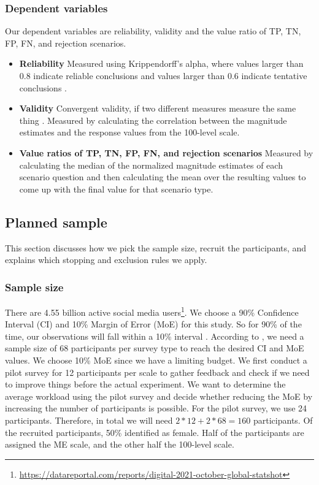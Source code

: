 \subsubsection{Dependent variables}
Our dependent variables are reliability, validity and the value ratio of TP, TN, FP, FN, and rejection scenarios.
%
\begin{itemize}
    \item \textbf{Reliability} Measured using Krippendorff's alpha, where values larger than 0.8 indicate reliable conclusions and values larger than 0.6 indicate tentative conclusions \citep{krippendorff2004reliability}.
    \item \textbf{Validity} Convergent validity, if two different measures measure the same thing \citep{fitzner2007reliability}. Measured by calculating the correlation between the magnitude estimates and the response values from the 100-level scale.
    \item \textbf{Value ratios of TP, TN, FP, FN, and rejection scenarios} Measured by calculating the median of the normalized magnitude estimates of each scenario question and then calculating the mean over the resulting values to come up with the final value for that scenario type.
\end{itemize}

\subsection{Planned sample}
This section discusses how we pick the sample size, recruit the participants, and explains which stopping and exclusion rules we apply.

\subsubsection{Sample size}
There are 4.55 billion active social media users\footnote{\url{https://datareportal.com/reports/digital-2021-october-global-statshot}}.
%
We choose a 90\% Confidence Interval (CI) and 10\% Margin of Error (MoE) for this study.
%
So for 90\% of the time, our observations will fall within a 10\% interval \citep{olson2014ways}.
%
According to \citet{olson2014ways}, we need a sample size of 68 participants per survey type to reach the desired CI and MoE values.
%
We choose 10\% MoE since we have a limiting budget.
%
We first conduct a pilot survey for 12 participants per scale to gather feedback and check if we need to improve things before the actual experiment.
%
We want to determine the average workload using the pilot survey and decide whether reducing the MoE by increasing the number of participants is possible.
%
For the pilot survey, we use 24 participants.
%
Therefore, in total we will need $2*12+2*68 = 160$ participants.
%
Of the recruited participants, 50\% identified as female.
%
Half of the participants are assigned the ME scale, and the other half the 100-level scale.

